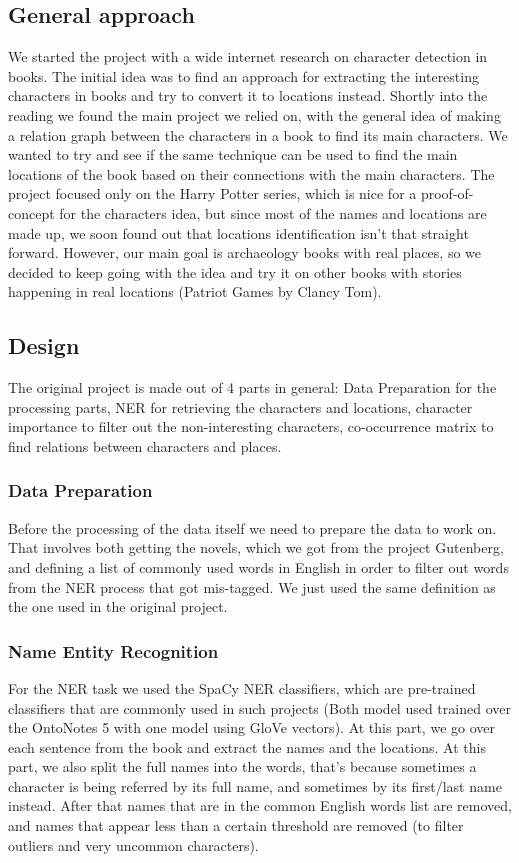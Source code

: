 \documentclass{article}
\begin{document}
\subsection{General approach}
We started the project with a wide internet research on character detection in books. The initial idea was to find an approach for extracting the interesting characters in books and try to convert it to locations instead.\newline
Shortly into the reading we found the main project we relied on, with the general idea of making a relation graph between the characters in a book to find its main characters. We wanted to try and see if the same technique can be used to find the main locations of the book based on their connections with the main characters.\newline
The project focused only on the Harry Potter series, which is nice for a proof-of-concept for the characters idea, but since most of the names and locations are made up, we soon found out that locations identification isn't that straight forward. However, our main goal is archaeology books with real places, so we decided to keep going with the idea and try it on other books with stories happening in real locations (Patriot Games by Clancy Tom).

\subsection{Design}
The original project is made out of 4 parts in general: Data Preparation for the processing parts, NER for retrieving the characters and locations, character importance to filter out the non-interesting characters, co-occurrence matrix to find relations between characters and places.
\subsubsection{Data Preparation}
Before the processing of the data itself we need to prepare the data to work on. That involves both getting the novels, which we got from the project Gutenberg\cite{projectgutenberg}, and defining a list of commonly used words in English in order to filter out words from the NER process that got mis-tagged. We just used the same definition as the one used in the original project.
\subsubsection{Name Entity Recognition}
For the NER task we used the SpaCy NER classifiers\cite{spacy}, which are pre-trained classifiers that are commonly used in such projects (Both model used trained over the OntoNotes 5\cite{ontonotes} with one model using GloVe vectors). At this part, we go over each sentence from the book and extract the names and the locations. At this part, we also split the full names into the words, that's because sometimes a character is being referred by its full name, and sometimes by its first/last name instead. After that names that are in the common English words list are removed, and names that appear less than a certain threshold are removed (to filter outliers and very uncommon characters).
\end{document}
